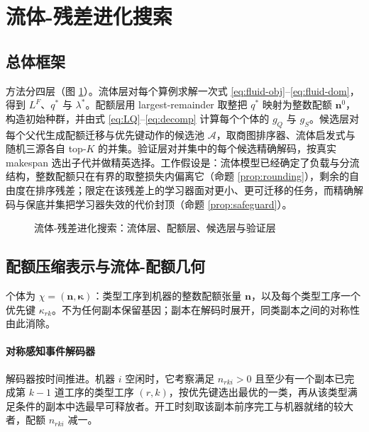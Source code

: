 \section{流体-残差进化搜索}\label{sec:method}

\subsection{总体框架}\label{sec:framework}
方法分四层（图 \ref{fig:framework}）。流体层对每个算例求解一次式 \eqref{eq:fluid-obj}--\eqref{eq:fluid-dom}，得到 $L^F$、$q^*$ 与 $\lambda^*$。配额层用 largest-remainder 取整把 $q^*$ 映射为整数配额 $\mathbf{n}^0$，构造初始种群，并由式 \eqref{eq:LQ}--\eqref{eq:decomp} 计算每个个体的 $g_Q$ 与 $g_S$。候选层对每个父代生成配额迁移与优先键动作的候选池 $\mathcal{A}$，取商图排序器、流体启发式与随机三源各自 top-$K$ 的并集。验证层对并集中的每个候选精确解码，按真实 makespan 选出子代并做精英选择。工作假设是：流体模型已经确定了负载与分流结构，整数配额只在有界的取整损失内偏离它（命题 \ref{prop:rounding}），剩余的自由度在排序残差；限定在该残差上的学习器面对更小、更可迁移的任务，而精确解码与保底并集把学习器失效的代价封顶（命题 \ref{prop:safeguard}）。

\begin{figure}[htbp]
\caption{流体-残差进化搜索：流体层、配额层、候选层与验证层}\label{fig:framework}
\end{figure}

\subsection{配额压缩表示与流体-配额几何}\label{sec:quota}
个体为 $\chi = (\mathbf{n}, \boldsymbol{\kappa})$：类型工序到机器的整数配额张量 $\mathbf{n}$，以及每个类型工序一个优先键 $\kappa_{rk}$。不为任何副本保留基因；副本在解码时展开，同类副本之间的对称性由此消除。

\paragraph{对称感知事件解码器} 解码器按时间推进。机器 $i$ 空闲时，它考察满足 $n_{rki} > 0$ 且至少有一个副本已完成第 $k-1$ 道工序的类型工序 $(r,k)$，按优先键选出最优的一类，再从该类型满足条件的副本中选最早可释放者。开工时刻取该副本前序完工与机器就绪的较大者，配额 $n_{rki}$ 减一。

